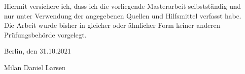 
Hiermit versichere ich, dass ich die vorliegende Masterarbeit selbstständig und nur unter
Verwendung der angegebenen Quellen und Hilfsmittel verfasst habe. Die Arbeit wurde bisher
in gleicher oder ähnlicher Form keiner anderen Prüfungsbehörde vorgelegt.

\vskip 1cm

Berlin, den 31.10.2021

\vskip 1.5cm

Milan Daniel Larsen